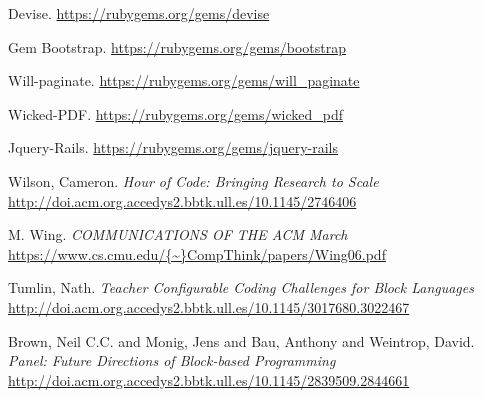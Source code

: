 \documentclass{beamer}
\begin{document}
\begin{frame}[allowframebreaks]
\begin{thebibliography}{10}
    \beamertemplatebookbibitems
    Devise. {\small{\url{https://rubygems.org/gems/devise}}}

    \beamertemplatebookbibitems
    Gem Bootstrap. {\small{\url{https://rubygems.org/gems/bootstrap}}}

    \beamertemplatebookbibitems
    Will-paginate. {\small{\url{https://rubygems.org/gems/will_paginate}}}

    \beamertemplatebookbibitems
    Wicked-PDF. {\small{\url{https://rubygems.org/gems/wicked_pdf}}}

    \beamertemplatebookbibitems
    Jquery-Rails. {\small{\url{https://rubygems.org/gems/jquery-rails}}}

    \beamertemplatebookbibitems
    Wilson, Cameron. 
    \emph{Hour of Code: Bringing Research to Scale} 
    {\small{\url{http://doi.acm.org.accedys2.bbtk.ull.es/10.1145/2746406}}}

    \beamertemplatebookbibitems
    M. Wing. 
    \emph{COMMUNICATIONS OF THE ACM March} 
    {\small{\url{https://www.cs.cmu.edu/{~}CompThink/papers/Wing06.pdf}}}

    \beamertemplatebookbibitems
    Tumlin, Nath. 
    \emph{Teacher Configurable Coding Challenges for Block Languages} 
    {\small{\url{http://doi.acm.org.accedys2.bbtk.ull.es/10.1145/3017680.3022467}}}

    \beamertemplatebookbibitems
    Brown, Neil C.C. and Monig, Jens and Bau, Anthony and Weintrop, David. 
    \emph{Panel: Future Directions of Block-based Programming} 
    {\small{\url{http://doi.acm.org.accedys2.bbtk.ull.es/10.1145/2839509.2844661}}}


  \end{thebibliography}
\end{frame}


\end{document}

